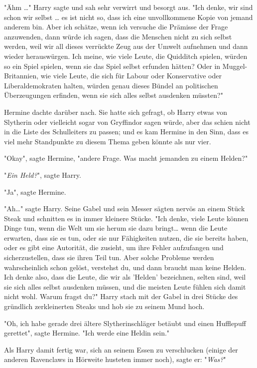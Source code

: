 {"Ähm …" Harry sagte und sah sehr verwirrt und besorgt aus. "Ich denke, wir sind schon wir selbst … es ist nicht so, dass ich eine unvollkommene Kopie von jemand anderem bin. Aber ich schätze, wenn ich versuche die Prämisse der Frage anzuwenden, dann würde ich sagen, dass die Menschen nicht zu sich selbst werden, weil wir all dieses verrückte Zeug aus der Umwelt aufnehmen und dann wieder herauswürgen. Ich meine, wie viele Leute, die Quidditch spielen, würden so ein Spiel spielen, wenn sie das Spiel selbst erfunden hätten? Oder in Muggel-Britannien, wie viele Leute, die sich für Labour oder Konservative oder Liberaldemokraten halten, würden genau dieses Bündel an politischen Überzeugungen erfinden, wenn sie sich alles selbst ausdenken müssten?"

Hermine dachte darüber nach. Sie hatte sich gefragt, ob Harry etwas von Slytherin oder vielleicht sogar von Gryffindor sagen würde, aber das schien nicht in die Liste des Schulleiters zu passen; und es kam Hermine in den Sinn, dass es viel mehr Standpunkte zu diesem Thema geben könnte als nur vier.

"Okay", sagte Hermine, "andere Frage. Was macht jemanden zu einem Helden?"

"\emph{Ein Held?}", sagte Harry.

"Ja", sagte Hermine.

"Ah…" sagte Harry. Seine Gabel und sein Messer sägten nervös an einem Stück Steak und schnitten es in immer kleinere Stücke. "Ich denke, viele Leute können Dinge tun, wenn die Welt um sie herum sie dazu bringt… wenn die Leute erwarten, dass sie es tun, oder sie nur Fähigkeiten nutzen, die sie bereits haben, oder es gibt eine Autorität, die zusieht, um ihre Fehler aufzufangen und sicherzustellen, dass sie ihren Teil tun. Aber solche Probleme werden wahrscheinlich schon gelöst, verstehst du, und dann braucht man keine Helden. Ich denke also, dass die Leute, die wir als 'Helden' bezeichnen, selten sind, weil sie sich alles selbst ausdenken müssen, und die meisten Leute fühlen sich damit nicht wohl. Warum fragst du?" Harry stach mit der Gabel in drei Stücke des gründlich zerkleinerten Steaks und hob sie zu seinem Mund hoch.

"Oh, ich habe gerade drei ältere Slytherinschläger betäubt und einen Hufflepuff gerettet", sagte Hermine. "Ich werde eine Heldin sein."

Als Harry damit fertig war, sich an seinem Essen zu verschlucken (einige der anderen Ravenclaws in Hörweite husteten immer noch), sagte er: "\emph{Was?}"

}
